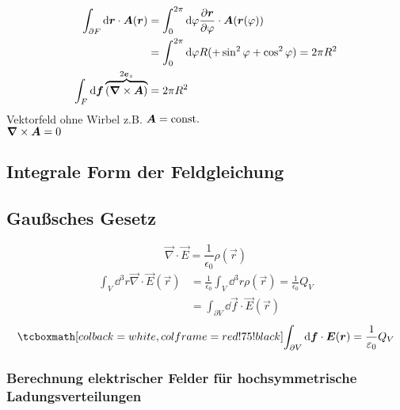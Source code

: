 \begin{align*}
\int_{\partial F} \textrm{d} \bm{r} \cdot \bm{A}(\bm{r}) &= \int_{0}^{2 \pi} \textrm{d} \varphi \frac{\partial \bm{r}}{\partial \varphi} \cdot \bm{A}( \bm{r} ( \varphi)) \\
&= \int_{0}^{2 \pi} \textrm{d} \varphi R ( + \sin^2 \varphi + \cos^2 \varphi) = 2 \pi R^2\\
\int_F \textrm{d}\bm{f} \overbrace{\left(\bm{\nabla} \times  \bm{A}\right)}^{2 \bm{e}_z} &= 2 \pi R^2
\end{align*}
Vektorfeld ohne Wirbel z.B. $\bm{A} = \textrm{const.}$\\
%
%
%
%
%
%
$\bm{\nabla} \times \bm{A} = 0$\\
%
%
%
%
%
%
\bem
%
%
%
%
%
%
%
%
%
%
%
\subsection{Integrale Form der Feldgleichung}

\subsection{Gaußsches Gesetz}

\begin{equation*}
\vec{\nabla} \cdot \vec{E} = \frac{1}{\epsilon_0} \rho(\vec{r})
\end{equation*}
%
%
%
%
%
%
\begin{align*}
\int_{V} \dd^3 r \vec{\nabla} \cdot \vec{E}(\vec{r}) &= \frac{1}{\epsilon_0} \int_{V} \dd^3 r \rho (\vec{r}) = \frac{1}{\epsilon_0} Q_V\\
&= \int_{\partial V} \dd\vec{f} \cdot \vec{E}(\vec{r})
\end{align*}
\begin{equation*}
\rmbox{\int_{\partial V} \dd \vec{f} \cdot \vec{E}(\vec{r}) = \frac{1}{\epsilon_0} Q_V}
\end{equation*}

\subsubsection{Berechnung elektrischer Felder für hochsymmetrische Ladungsverteilungen}

